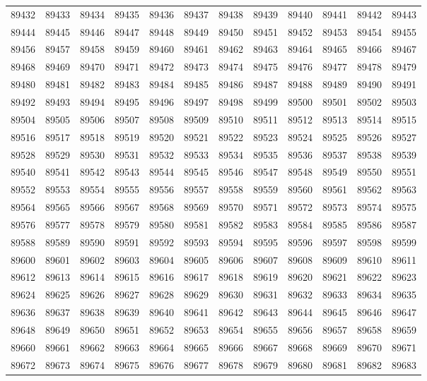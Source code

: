 \begin{center}
\begin{longtable}{llllllllllll}
89432 &89433 &89434 &89435 &89436 &89437 &89438 &89439 &89440 &89441 &89442 &89443 \\
89444 &89445 &89446 &89447 &89448 &89449 &89450 &89451 &89452 &89453 &89454 &89455 \\
89456 &89457 &89458 &89459 &89460 &89461 &89462 &89463 &89464 &89465 &89466 &89467 \\
89468 &89469 &89470 &89471 &89472 &89473 &89474 &89475 &89476 &89477 &89478 &89479 \\
89480 &89481 &89482 &89483 &89484 &89485 &89486 &89487 &89488 &89489 &89490 &89491 \\
89492 &89493 &89494 &89495 &89496 &89497 &89498 &89499 &89500 &89501 &89502 &89503 \\
89504 &89505 &89506 &89507 &89508 &89509 &89510 &89511 &89512 &89513 &89514 &89515 \\
89516 &89517 &89518 &89519 &89520 &89521 &89522 &89523 &89524 &89525 &89526 &89527 \\
89528 &89529 &89530 &89531 &89532 &89533 &89534 &89535 &89536 &89537 &89538 &89539 \\
89540 &89541 &89542 &89543 &89544 &89545 &89546 &89547 &89548 &89549 &89550 &89551 \\
89552 &89553 &89554 &89555 &89556 &89557 &89558 &89559 &89560 &89561 &89562 &89563 \\
89564 &89565 &89566 &89567 &89568 &89569 &89570 &89571 &89572 &89573 &89574 &89575 \\
89576 &89577 &89578 &89579 &89580 &89581 &89582 &89583 &89584 &89585 &89586 &89587 \\
89588 &89589 &89590 &89591 &89592 &89593 &89594 &89595 &89596 &89597 &89598 &89599 \\
89600 &89601 &89602 &89603 &89604 &89605 &89606 &89607 &89608 &89609 &89610 &89611 \\
89612 &89613 &89614 &89615 &89616 &89617 &89618 &89619 &89620 &89621 &89622 &89623 \\
89624 &89625 &89626 &89627 &89628 &89629 &89630 &89631 &89632 &89633 &89634 &89635 \\
89636 &89637 &89638 &89639 &89640 &89641 &89642 &89643 &89644 &89645 &89646 &89647 \\
89648 &89649 &89650 &89651 &89652 &89653 &89654 &89655 &89656 &89657 &89658 &89659 \\
89660 &89661 &89662 &89663 &89664 &89665 &89666 &89667 &89668 &89669 &89670 &89671 \\
89672 &89673 &89674 &89675 &89676 &89677 &89678 &89679 &89680 &89681 &89682 &89683 \\

\end{longtable}
\end{center}
